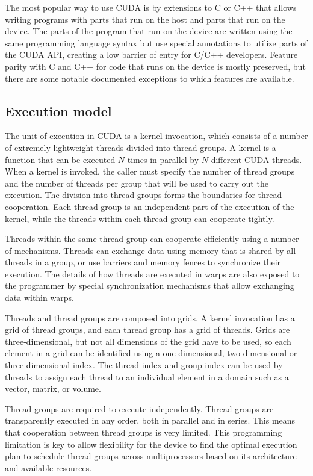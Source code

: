 The most popular way to use CUDA is by extensions to C or C++ that allows writing programs with parts that run on the host and parts that run on the device. The parts of the program that run on the device are written using the same programming language syntax but use special annotations to utilize parts of the CUDA API, creating a low barrier of entry for C/C++ developers. Feature parity with C and C++ for code that runs on the device is mostly preserved, but there are some notable documented exceptions to which features are available.

\subsection{Execution model}

The unit of execution in CUDA is a kernel invocation, which consists of a number of extremely lightweight threads divided into thread groups. A kernel is a function that can be executed \(N\) times in parallel by \(N\) different CUDA threads. When a kernel is invoked, the caller must specify the number of thread groups and the number of threads per group that will be used to carry out the execution. The division into thread groups forms the boundaries for thread cooperation. Each thread group is an independent part of the execution of the kernel, while the threads within each thread group can cooperate tightly.

Threads within the same thread group can cooperate efficiently using a number of mechanisms. Threads can exchange data using memory that is shared by all threads in a group, or use barriers and memory fences to synchronize their execution. The details of how threads are executed in warps are also exposed to the programmer by special synchronization mechanisms that allow exchanging data within warps.


Threads and thread groups are composed into grids. A kernel invocation has a grid of thread groups, and each thread group has a grid of threads. Grids are three-dimensional, but not all dimensions of the grid have to be used, so each element in a grid can be identified using a one-dimensional, two-dimensional or three-dimensional index. The thread index and group index can be used by threads to assign each thread to an individual element in a domain such as a vector, matrix, or volume.

Thread groups are required to execute independently. Thread groups are transparently executed in any order, both in parallel and in series. This means that cooperation between thread groups is very limited. This programming limitation is key to allow flexibility for the device to find the optimal execution plan to schedule thread groups across multiprocessors based on its architecture and available resources.

